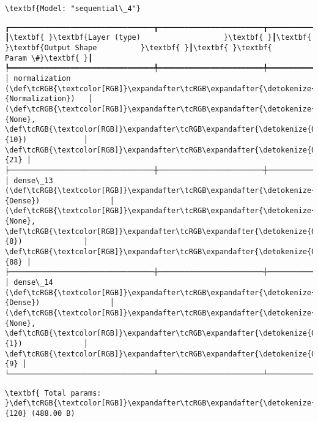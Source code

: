 \documentclass[11pt]{article}
\begin{document}
    
    \begin{Verbatim}[commandchars=\\\{\}]
\textbf{Model: "sequential\_4"}

    \end{Verbatim}

    
    
    \begin{Verbatim}[commandchars=\\\{\}]
┏━━━━━━━━━━━━━━━━━━━━━━━━━━━━━━━━━┳━━━━━━━━━━━━━━━━━━━━━━━━┳━━━━━━━━━━━━━━━┓
┃\textbf{ }\textbf{Layer (type)                   }\textbf{ }┃\textbf{ }\textbf{Output Shape          }\textbf{ }┃\textbf{ }\textbf{      Param \#}\textbf{ }┃
┡━━━━━━━━━━━━━━━━━━━━━━━━━━━━━━━━━╇━━━━━━━━━━━━━━━━━━━━━━━━╇━━━━━━━━━━━━━━━┩
│ normalization (\def\tcRGB{\textcolor[RGB]}\expandafter\tcRGB\expandafter{\detokenize{0,135,255}}{Normalization})   │ (\def\tcRGB{\textcolor[RGB]}\expandafter\tcRGB\expandafter{\detokenize{0,215,255}}{None}, \def\tcRGB{\textcolor[RGB]}\expandafter\tcRGB\expandafter{\detokenize{0,175,0}}{10})             │            \def\tcRGB{\textcolor[RGB]}\expandafter\tcRGB\expandafter{\detokenize{0,175,0}}{21} │
├─────────────────────────────────┼────────────────────────┼───────────────┤
│ dense\_13 (\def\tcRGB{\textcolor[RGB]}\expandafter\tcRGB\expandafter{\detokenize{0,135,255}}{Dense})                │ (\def\tcRGB{\textcolor[RGB]}\expandafter\tcRGB\expandafter{\detokenize{0,215,255}}{None}, \def\tcRGB{\textcolor[RGB]}\expandafter\tcRGB\expandafter{\detokenize{0,175,0}}{8})              │            \def\tcRGB{\textcolor[RGB]}\expandafter\tcRGB\expandafter{\detokenize{0,175,0}}{88} │
├─────────────────────────────────┼────────────────────────┼───────────────┤
│ dense\_14 (\def\tcRGB{\textcolor[RGB]}\expandafter\tcRGB\expandafter{\detokenize{0,135,255}}{Dense})                │ (\def\tcRGB{\textcolor[RGB]}\expandafter\tcRGB\expandafter{\detokenize{0,215,255}}{None}, \def\tcRGB{\textcolor[RGB]}\expandafter\tcRGB\expandafter{\detokenize{0,175,0}}{1})              │             \def\tcRGB{\textcolor[RGB]}\expandafter\tcRGB\expandafter{\detokenize{0,175,0}}{9} │
└─────────────────────────────────┴────────────────────────┴───────────────┘

    \end{Verbatim}

    
    
    \begin{Verbatim}[commandchars=\\\{\}]
\textbf{ Total params: }\def\tcRGB{\textcolor[RGB]}\expandafter\tcRGB\expandafter{\detokenize{0,175,0}}{120} (488.00 B)

    \end{Verbatim}
\end{document}
